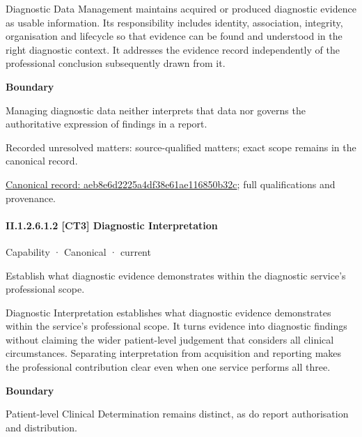 Diagnostic Data Management maintains acquired or produced diagnostic evidence as usable information. Its responsibility includes identity, association, integrity, organisation and lifecycle so that evidence can be found and understood in the right diagnostic context. It addresses the evidence record independently of the professional conclusion subsequently drawn from it.



\textbf{Boundary}



Managing diagnostic data neither interprets that data nor governs the authoritative expression of findings in a report.


{\small Recorded unresolved matters: source-qualified matters; exact scope remains in the canonical record.}\par
{\footnotesize \href{../../../../continuum/strategy/capability/aeb8e6d2225a4df38e61ae116850b32c.md}{Canonical record: aeb8e6d2225a4df38e61ae116850b32c}; full qualifications and provenance.}\par
\paragraph*{II.1.2.6.1.2 [CT3] Diagnostic Interpretation}
\label{navigation:II.1.2.6.1.2}

\label{element:82ad867109f1438eb1b0916ed9cd820f}
{\small Capability · Canonical · current}\par

Establish what diagnostic evidence demonstrates within the diagnostic service’s professional scope.



Diagnostic Interpretation establishes what diagnostic evidence demonstrates within the service's professional scope. It turns evidence into diagnostic findings without claiming the wider patient-level judgement that considers all clinical circumstances. Separating interpretation from acquisition and reporting makes the professional contribution clear even when one service performs all three.



\textbf{Boundary}



Patient-level Clinical Determination remains distinct, as do report authorisation and distribution.


